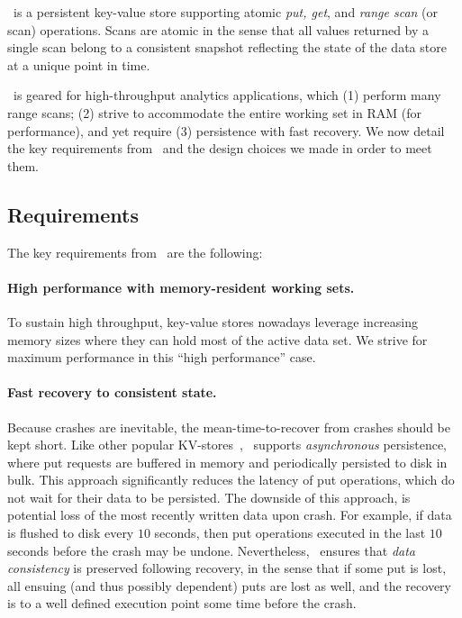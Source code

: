 

\sys\ is a persistent key-value store supporting atomic \emph{put, get}, and  \emph{range scan} (or scan) operations. 
Scans are atomic in the sense that all values returned by a single scan belong to a consistent snapshot reflecting
the state of the data store at a unique point in time.

\sys\ is geared for high-throughput analytics applications, which (1) perform many range scans; 
(2) strive to accommodate the entire working set in RAM (for performance), and yet require  (3)
persistence with fast recovery. We now detail the key requirements from \sys\ and the design choices we made in order to meet them.

\subsection{Requirements}

The key requirements from \sys\ are  the following:
\paragraph{High performance with memory-resident working sets.}
To sustain high throughput, key-value stores nowadays leverage increasing memory sizes where they can hold most of the 
active data set. We strive for maximum performance in this ``high performance'' case.  

\paragraph{Fast recovery to consistent state.}
Because crashes are inevitable, the mean-time-to-recover from crashes should be kept short.
Like other popular KV-stores~\cite{rocksdb,leveldb,hbase}, \sys\ supports \emph{asynchronous} persistence, 
where put requests are buffered in memory and periodically persisted to disk in bulk. 
This approach significantly reduces the latency of put operations, which do not wait for their data to be persisted.
The downside of this approach, is potential loss of the most recently written data upon crash. For example, 
if data is flushed to disk every $10$ seconds, then put operations executed in the last $10$ seconds before the crash 
may be undone. 
Nevertheless, \sys\ ensures that \emph{data consistency} is preserved following recovery, in the sense that 
if some put is lost, all ensuing (and thus possibly dependent) puts are lost as well, and the recovery is to a well 
defined execution point some time before the crash.
 
